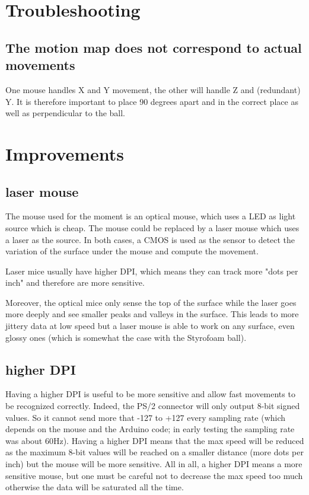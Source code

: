 \documentclass[a4paper]{article}
\begin{document}
\section{Troubleshooting}
\subsection{The motion map does not correspond to actual movements}
One mouse handles X and Y movement, the other will handle Z and (redundant) Y. It is therefore important to place 90 degrees apart and in the correct place as well as perpendicular to the ball.
\section{Improvements}
\subsection{laser mouse}
The mouse used for the moment is an optical mouse, which uses a LED as light source which is cheap. The mouse could be replaced by a laser mouse which uses a laser as the source.
In both cases, a CMOS is used as the sensor to detect the variation of the surface under the mouse and compute the movement.

Laser mice usually have higher DPI, which means they can track more "dots per inch" and therefore are more sensitive.

Moreover, the optical mice only sense the top of the surface while the laser goes more deeply and see smaller peaks and valleys in the surface. This leads to more jittery data at low speed but a laser mouse is able to work on any surface, even glossy ones (which is somewhat the case with the Styrofoam ball).

\subsection{higher DPI}
Having a higher DPI is useful to be more sensitive and allow fast movements to be recognized correctly. Indeed, the PS/2 connector will only output 8-bit signed values. So it cannot send more that -127 to +127 every sampling rate (which depends on the mouse and the Arduino code; in early testing the sampling rate was about 60Hz). 
Having a higher DPI means that the max speed will be reduced as the maximum 8-bit values will be reached on a smaller distance (more dots per inch) but the mouse will be more sensitive.
All in all, a higher DPI means a more sensitive mouse, but one must be careful not to decrease the max speed too much otherwise the data will be saturated all the time.
\end{document}
